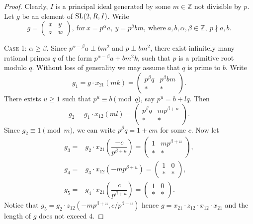 \begin{proof}
Clearly, $I$ is a principal ideal generated by some $m\in\mathbb{Z}$ not divisible by $p$.
Let $g$ be an element of $\operatorname{SL}(2,R,I)$. Write
\[ g=\begin{pmatrix}x & y \\ z & w\end{pmatrix},\ \text{for}\ x=p^\alpha a,\ y=p^\beta bm,\ \text{where}\ a,b,\alpha,\beta\in\mathbb{Z},\ p\nmid a,b. \]

\textsc{Case 1:} $\alpha\geqslant\beta$. 
Since $p^{\alpha-\beta}a\perp bm^2$ and $p\perp bm^2$, there exist infinitely many rational primes $q$ of the form $p^{\alpha-\beta}a+bm^2k$,
such that $p$ is a primitive root modulo $q$. 
Without loss of generality we may assume that $q$ is prime to $b$. 
Write
\[ g_1=g\cdot x_{21}(mk) =
\begin{pmatrix} p^\beta q & p^\beta bm \\ * & * \end{pmatrix}.\]
There exists $u\geqslant 1$ such that $p^u\equiv b\pmod q$, say $p^u=b+lq$. Then
\[ g_2 = g_1\cdot x_{12}(ml) =
\begin{pmatrix} p^\beta q & mp^{\beta+u} \\ * & * \end{pmatrix}. \]
Since $g_2\equiv 1\pmod m$, we can write $p^\beta q=1+cm$ for some $c$. Now let
\begin{align*}
g_3 = & g_2\cdot x_{21}\left(\dfrac{-c}{p^{\beta+u}}\right) =
\begin{pmatrix} 1 & mp^{\beta+u} \\ * & * \end{pmatrix}, \\
g_4 = & g_3\cdot x_{12}\left(-mp^{\beta+u}\right) =
\begin{pmatrix} 1 & 0 \\ * & * \end{pmatrix}, \\
g_5 = & g_4\cdot x_{21}\left(\dfrac{c}{p^{\beta+u}}\right) =
\begin{pmatrix} 1 & 0 \\ * & * \end{pmatrix}.
\end{align*}
Notice that $g_5=g_2\cdot z_{12}\left(-mp^{\beta+u},c/p^{\beta+u}\right)$ hence $g=x_{21} \cdot z_{12} \cdot x_{12} \cdot x_{21}$
and the length of $g$ does not exceed $4$.


\end{proof}
